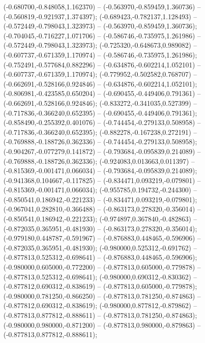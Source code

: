  (-0.680700,-0.848058,1.162370) -- (-0.563970,-0.859459,1.360736) -- (-0.560819,-0.921937,1.374397);
 (-0.689423,-0.782137,1.128493) -- (-0.572449,-0.798043,1.323973) -- (-0.563970,-0.859459,1.360736);
 (-0.704045,-0.716227,1.071706) -- (-0.586746,-0.735975,1.261986) -- (-0.572449,-0.798043,1.323973);
 (-0.725320,-0.648673,0.989082) -- (-0.607737,-0.671359,1.170974) -- (-0.586746,-0.735975,1.261986);
 (-0.752491,-0.577684,0.882296) -- (-0.634876,-0.602214,1.052101) -- (-0.607737,-0.671359,1.170974);
 (-0.779952,-0.502582,0.768707) -- (-0.662691,-0.528166,0.924846) -- (-0.634876,-0.602214,1.052101);
 (-0.806981,-0.423585,0.650204) -- (-0.690455,-0.449406,0.791361) -- (-0.662691,-0.528166,0.924846);
 (-0.833272,-0.341035,0.527399) -- (-0.717836,-0.366240,0.652395) -- (-0.690455,-0.449406,0.791361);
 (-0.858490,-0.255392,0.401076) -- (-0.744454,-0.279133,0.508958) -- (-0.717836,-0.366240,0.652395);
 (-0.882278,-0.167238,0.272191) -- (-0.769888,-0.188726,0.362336) -- (-0.744454,-0.279133,0.508958);
 (-0.904267,-0.077279,0.141872) -- (-0.793684,-0.095839,0.214089) -- (-0.769888,-0.188726,0.362336);
 (-0.924083,0.013663,0.011397) -- (-0.815369,-0.001471,0.066034) -- (-0.793684,-0.095839,0.214089);
 (-0.941368,0.104667,-0.117825) -- (-0.834471,0.093219,-0.079801) -- (-0.815369,-0.001471,0.066034);
 (-0.955785,0.194732,-0.244300) -- (-0.850541,0.186942,-0.221233) -- (-0.834471,0.093219,-0.079801);
 (-0.967041,0.282810,-0.366488) -- (-0.863173,0.278320,-0.356014) -- (-0.850541,0.186942,-0.221233);
 (-0.974897,0.367840,-0.482863) -- (-0.872035,0.365951,-0.481930) -- (-0.863173,0.278320,-0.356014);
 (-0.979180,0.448787,-0.591967) -- (-0.876883,0.448465,-0.596906) -- (-0.872035,0.365951,-0.481930);
 (-0.980000,0.525312,-0.691762) -- (-0.877813,0.525312,-0.698641) -- (-0.876883,0.448465,-0.596906);
 (-0.980000,0.605000,-0.772200) -- (-0.877813,0.605000,-0.779878) -- (-0.877813,0.525312,-0.698641);
 (-0.980000,0.690312,-0.830362) -- (-0.877812,0.690312,-0.838619) -- (-0.877813,0.605000,-0.779878);
 (-0.980000,0.781250,-0.866250) -- (-0.877813,0.781250,-0.874863) -- (-0.877812,0.690312,-0.838619);
 (-0.980000,0.877812,-0.879862) -- (-0.877813,0.877812,-0.888611) -- (-0.877813,0.781250,-0.874863);
 (-0.980000,0.980000,-0.871200) -- (-0.877813,0.980000,-0.879863) -- (-0.877813,0.877812,-0.888611);
